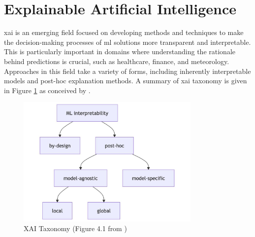 \section{Explainable Artificial Intelligence}

\acrfull{xai} is an emerging field focused on developing methods and techniques to make the decision-making processes of \acrshort{ml} solutions more transparent and interpretable. This is particularly important in domains where understanding the rationale behind predictions is crucial, such as healthcare, finance, and meteorology. Approaches in this field take a variety of forms, including inherently interpretable models and post-hoc explanation methods. A summary of \acrshort{xai} taxonomy is given in Figure \ref{fig:xai-taxonomy} as conceived by \citep{Molnar2025}.

\begin{figure}[h]
    \centering
    \includegraphics[width=0.8\textwidth]{../figures/static/xai-taxonomy.jpg}
    \caption{XAI Taxonomy (Figure 4.1 from \cite{Molnar2025})}
    \label{fig:xai-taxonomy}
\end{figure}

